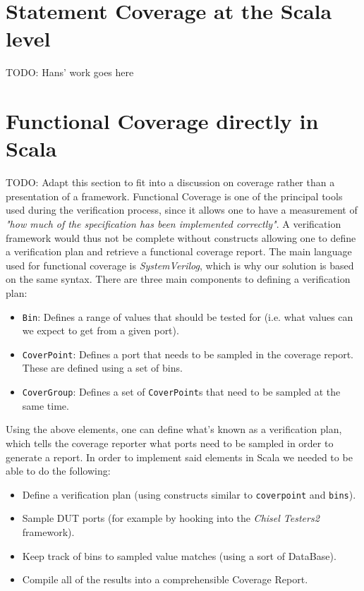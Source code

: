 \documentclass[conference]{IEEEtran}
\newcommand{\todo}[1]{{\color{olive} TODO: #1}}
\begin{document}
\section{Statement Coverage at the Scala level}
\todo{Hans' work goes here}

\section{Functional Coverage directly in Scala}
\todo{Adapt this section to fit into a discussion on coverage rather than a presentation of a framework.}
Functional Coverage is one of the principal tools used during the verification process, since it allows one to have a measurement of \textit{"how much of the specification has been implemented correctly"}. A verification framework would thus not be complete without constructs allowing one to define a verification plan and retrieve a functional coverage report. The main language used for functional coverage is \textit{SystemVerilog}, which is why our solution is based on the same syntax. There are three main components to defining a verification plan: 
\begin{itemize}
\item \texttt{Bin}: Defines a range of values that should be tested for (i.e. what values can we expect to get from a given port).
\item \texttt{CoverPoint}: Defines a port that needs to be sampled in the coverage report. These are defined using a set of bins.
\item \texttt{CoverGroup}: Defines a set of \texttt{CoverPoint}s that need to be sampled at the same time.
\end{itemize}
Using the above elements, one can define what's known as a verification plan, which tells the coverage reporter what ports need to be sampled in order to generate a report.
In order to implement said elements in Scala we needed to be able to do the following:
\begin{itemize}
\item Define a verification plan (using constructs similar to \texttt{coverpoint} and \texttt{bins}).
\item Sample DUT ports (for example by hooking into the \textit{Chisel Testers2} framework).
\item Keep track of bins to sampled value matches (using a sort of DataBase).
\item Compile all of the results into a comprehensible Coverage Report.
\end{itemize}
\end{document}
